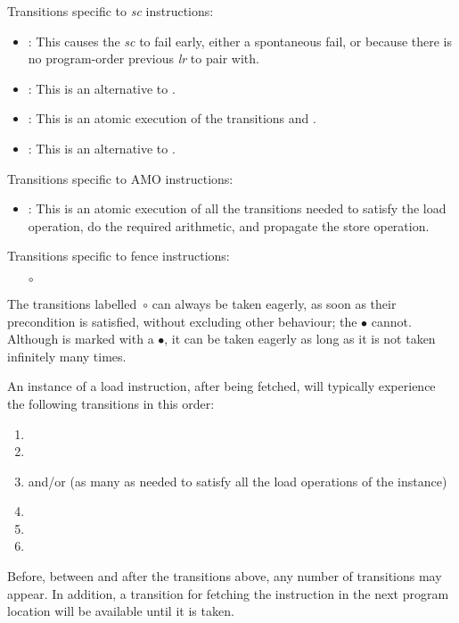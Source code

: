 \noindent Transitions specific to {\em  sc} instructions:
\begin{itemize}
\item {}: This causes the {\em sc} to fail early, either a spontaneous fail, or because there is no program-order previous {\em lr} to pair with.
\item {}: This is an alternative to . 
\item {}: This is an atomic execution of the transitions  and .
\item {}: This is an alternative to . 
\end{itemize}

\noindent Transitions specific to AMO instructions:
\begin{itemize}
\item {}: This is an atomic execution of all the transitions needed to satisfy the load operation, do the required arithmetic, and propagate the store operation.
\end{itemize}

\noindent Transitions specific to fence instructions:
\begin{itemize}
\item[$\circ$] 
\end{itemize}

The transitions labelled~$\circ$ can always be taken eagerly, as soon as their precondition is satisfied, without excluding other behaviour; the $\bullet$ cannot.
Although  is marked with a $\bullet$, it can be taken eagerly as long as it is not taken infinitely many times.

An instance of a load instruction, after being fetched, will typically experience the following transitions in this order:
\begin{enumerate}
\item {}
\item {}
\item {} and/or  (as many as needed to satisfy all the load operations of the instance)
\item {}
\item {}
\item {}
\end{enumerate}
Before, between and after the transitions above, any number of  transitions may appear.
In addition, a  transition for fetching the instruction in the next program location will be available until it is taken.


